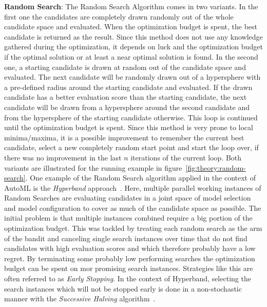 \textbf{Random Search}: The Random Search Algorithm comes in two variants.
In the first one the candidates are completely drawn randomly out of the whole candidate space and evaluated.
When the optimization budget is spent, the best candidate is returned as the result.
Since this method does not use any knowledge gathered during the optimization, it depends on luck and the optimization budget if the optimal solution or at least a near optimal solution is found.\newline
In the second one, a starting candidate is drawn at random out of the candidate space and evaluated.
The next candidate will be randomly drawn out of a hypersphere with a pre-defined radius around the starting candidate and evaluated.
If the drawn candidate has a better evaluation score than the starting candidate, the next candidate will be drawn from a hypersphere around the second candidate and from the hypersphere of the starting candidate otherwise.
This loop is continued until the optimization budget is spent. Since this method is very prone to local minima/maxima, it is a possible improvement to remember the current best candidate, select a new completely random start point and start the loop over, if there was no improvement in the last $n$ iterations of the current loop.
Both variants are illustrated for the running example in figure~\ref{fig:theory:random-search}.\newline
One example of the Random Search algorithm applied in the context of AutoML is the \textit{Hyperband} approach~\cite{Li-Hyperband}.
Here, multiple parallel working instances of Random Searches are evaluating candidates in a joint space of model selection and model configuration to cover as much of the candidate space as possible.
The initial problem is that multiple instances combined require a big portion of the optimization budget.
This was tackled by treating each random search as the arm of the bandit and canceling single search instances over time that do not find candidates with high evaluation scores and which therefore probably have a low regret.
By terminating some probably low performing searches the optimization budget can be spent on mor promising search instances.
Strategies like this are often referred to as \textit{Early Stopping}.
In the context of Hyperband, selecting the search instances which will not be stopped early is done in a non-stochastic manner with the \textit{Successive Halving} algorithm~\cite{Jamieson-SuccessiveHalving}.
